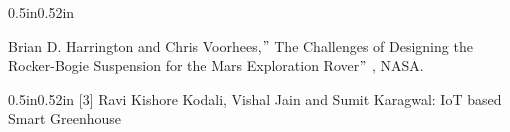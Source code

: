 \documentclass[12pt]{article}
\begin{document}
\begin{adjustwidth}{0.5in}{0.52in}
\begin{justify}
[2] Brian D. Harrington and Chris Voorhees,\textcolor[HTML]{00796B}{$"$ }The Challenges of Designing the Rocker-Bogie Suspension for the Mars Exploration Rover\textcolor[HTML]{00796B}{$"$ } , NASA.
\end{justify}\par

\end{adjustwidth}

\setlength{\parskip}{18.96pt}
\begin{adjustwidth}{0.5in}{0.52in}
[3] Ravi Kishore Kodali, Vishal Jain and Sumit Karagwal: IoT based Smart Greenhouse\par

\end{adjustwidth}


\printbibliography
\end{document}
